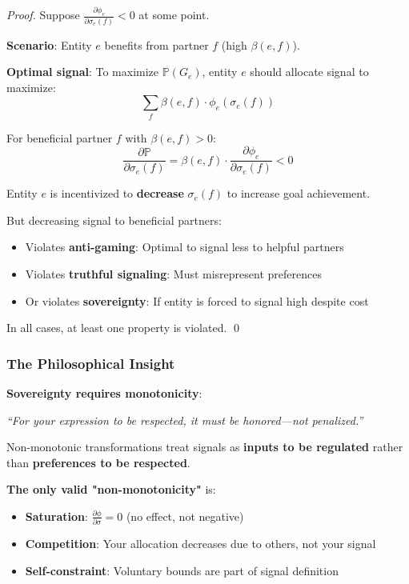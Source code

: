 \documentclass[11pt,a4paper]{article}
\theoremstyle{definition}
\theoremstyle{remark}
\begin{document}
\begin{proof}
Suppose $\frac{\partial \phi_e}{\partial \sigma_e(f)} < 0$ at some point.

\textbf{Scenario}: Entity $e$ benefits from partner $f$ (high $\beta(e,f)$).

\textbf{Optimal signal}: To maximize $\mathbb{P}(G_e)$, entity $e$ should allocate signal to maximize:
\[ \sum_f \beta(e,f) \cdot \phi_e(\sigma_e(f)) \]

For beneficial partner $f$ with $\beta(e,f) > 0$:
\[ \frac{\partial \mathbb{P}}{\partial \sigma_e(f)} = \beta(e,f) \cdot \frac{\partial \phi_e}{\partial \sigma_e(f)} < 0 \]

Entity $e$ is incentivized to \textbf{decrease} $\sigma_e(f)$ to increase goal achievement.

But decreasing signal to beneficial partners:
\begin{itemize}
\item Violates \textbf{anti-gaming}: Optimal to signal less to helpful partners
\item Violates \textbf{truthful signaling}: Must misrepresent preferences
\item Or violates \textbf{sovereignty}: If entity is forced to signal high despite cost
\end{itemize}

In all cases, at least one property is violated. \qed
\end{proof}

\subsubsection{The Philosophical Insight}

\textbf{Sovereignty requires monotonicity}:

\begin{center}
\textit{``For your expression to be respected, it must be honored—not penalized.''}
\end{center}

Non-monotonic transformations treat signals as \textbf{inputs to be regulated} rather than \textbf{preferences to be respected}.

\textbf{The only valid "non-monotonicity"} is:
\begin{itemize}
\item \textbf{Saturation}: $\frac{\partial \phi}{\partial \sigma} = 0$ (no effect, not negative)
\item \textbf{Competition}: Your allocation decreases due to others, not your signal
\item \textbf{Self-constraint}: Voluntary bounds are part of signal definition
\end{itemize}
\end{document}
